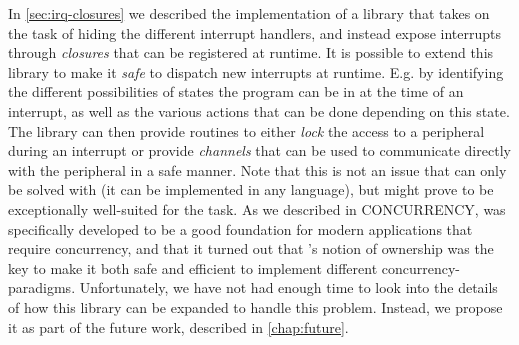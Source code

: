 In \autoref{sec:irq-closures} we described the implementation of a library that takes on the task of hiding the different interrupt handlers, and instead expose interrupts through \emph{closures} that can be registered at runtime.
It is possible to extend this library to make it \emph{safe} to dispatch new interrupts at runtime.
E.g. by identifying the different possibilities of states the program can be in at the time of an interrupt, as well as the various actions that can be done depending on this state.
The library can then provide routines to either \emph{lock} the access to a peripheral during an interrupt or provide \emph{channels} that can be used to communicate directly with the peripheral in a safe manner.
Note that this is not an issue that can only be solved with {\rust} (it can be implemented in any language), but {\rust} might prove to be exceptionally well-suited for the task.
As we described in CONCURRENCY, {\rust} was specifically developed to be a good foundation for modern applications that require concurrency, and that it turned out that {\rust}'s notion of ownership was the key to make it both safe and efficient to implement different concurrency-paradigms.
Unfortunately, we have not had enough time to look into the details of how this library can be expanded to handle this problem.
Instead, we propose it as part of the future work, described in \autoref{chap:future}.
